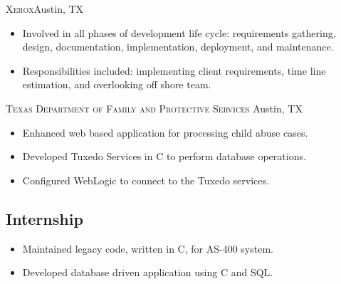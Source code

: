 \documentclass[11pt,letterpaper,sans]{moderncv}
\begin{document}
     {\textsc{Xerox}}{Austin, TX}{}
     {\begin{itemize}
         \item Involved in all phases of development life cycle:
               requirements gathering, design, documentation,
               implementation, deployment, and maintenance.
         \item Responsibilities included: implementing client requirements,
               time line estimation, and overlooking off shore team.
     \end{itemize}}

     {\textsc{Texas Department of Family and Protective Services}}
             {Austin, TX}{}
     {\begin{itemize}
         \item Enhanced web based application for processing child
               abuse cases.
         \item Developed Tuxedo Services in C to perform database operations.
         \item Configured WebLogic to connect to the Tuxedo services.
     \end{itemize}}

  \subsection{Internship}
     {\begin{itemize}
         \item Maintained legacy code, written in C, for AS-400 system.
         \item Developed database driven application using C and SQL.
     \end{itemize}}


\end{document}
